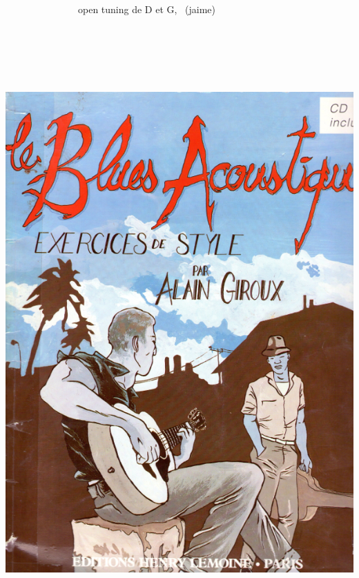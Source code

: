 \documentclass[a4paper]{book}
\begin{document}
\ \ \ \ \ \ \ \ \ \ \ \ \ \ \ open tuning de D et G,
\ (j{\textquotesingle}aime)









\begin{center}
\includegraphics[width=17cm,height=23.451cm]{lebluessupportsmethodes-img115.jpg}
\end{center}
\end{document}
